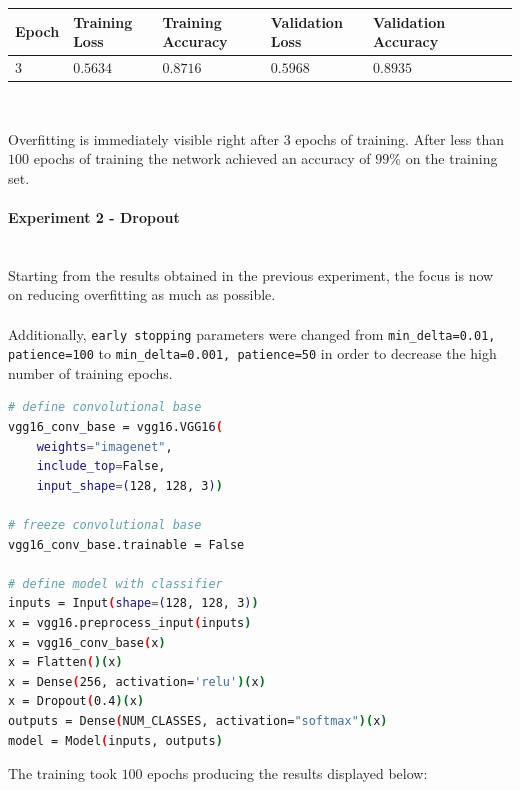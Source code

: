 \documentclass[11pt,a4paper]{article}
\begin{document}
\begin{center}
\hspace*{-0.8cm}
\begin{tabular}{|p{1.2cm}|p{1.8cm}|p{2cm}|p{2cm}|p{2cm}|p{2cm}|p{2cm}|}
\rowcolor{gray!50}
\hline
\textbf{Epoch} & \textbf{Training Loss} & \textbf{Training Accuracy} & \textbf{Validation Loss} & \textbf{Validation Accuracy}\\
\hline
$3$ & $0.5634$ & $0.8716$ & $0.5968$ & $0.8935$\\
\hline
\end{tabular}\\
\end{center}
Overfitting is immediately visible right after $3$ epochs of training. After less than $100$ epochs of training the network achieved an accuracy of $99\%$ on the training set.
\paragraph{Experiment 2 - Dropout}\mbox{}\\
Starting from the results obtained in the previous experiment, the focus is now on reducing overfitting as much as possible.\\
\\
Additionally, \texttt{early stopping} parameters were changed from \texttt{min\_delta=0.01, patience=100} to \texttt{min\_delta=0.001, patience=50} in order to decrease the high number of training epochs.
\begin{lstlisting}[language=bash,frame=single]
# define convolutional base
vgg16_conv_base = vgg16.VGG16(
    weights="imagenet",
    include_top=False,
    input_shape=(128, 128, 3))

# freeze convolutional base
vgg16_conv_base.trainable = False

# define model with classifier
inputs = Input(shape=(128, 128, 3))
x = vgg16.preprocess_input(inputs)
x = vgg16_conv_base(x)
x = Flatten()(x)
x = Dense(256, activation='relu')(x)
x = Dropout(0.4)(x)
outputs = Dense(NUM_CLASSES, activation="softmax")(x)
model = Model(inputs, outputs)
\end{lstlisting}
The training took $100$ epochs producing the results displayed below:
\end{document}
